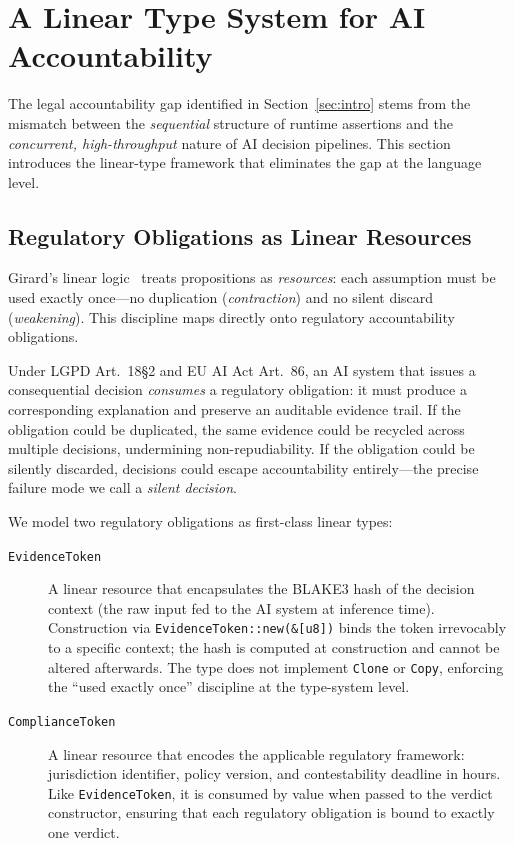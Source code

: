 
\section{A Linear Type System for AI Accountability}
\label{sec:type_system}

The legal accountability gap identified in Section~\ref{sec:intro}
stems from the mismatch between the \emph{sequential} structure of
runtime assertions and the \emph{concurrent, high-throughput} nature
of AI decision pipelines.  This section introduces the linear-type
framework that eliminates the gap at the language level.

\subsection{Regulatory Obligations as Linear Resources}
\label{sec:linear_resources}

Girard's linear logic~\cite{girard1987linear} treats propositions as
\emph{resources}: each assumption must be used exactly once---no
duplication (\emph{contraction}) and no silent discard
(\emph{weakening}).  This discipline maps directly onto regulatory
accountability obligations.

Under LGPD Art.~18\S2 and EU AI Act Art.~86, an AI system that
issues a consequential decision \emph{consumes} a regulatory
obligation: it must produce a corresponding explanation and preserve
an auditable evidence trail.  If the obligation could be duplicated,
the same evidence could be recycled across multiple decisions,
undermining non-repudiability.  If the obligation could be silently
discarded, decisions could escape accountability entirely---the
precise failure mode we call a \emph{silent decision}.

We model two regulatory obligations as first-class linear types:

\begin{description}
  \item[\texttt{EvidenceToken}]  A linear resource that encapsulates
    the BLAKE3 hash of the decision context (the raw input fed to the
    AI system at inference time).  Construction via
    \texttt{EvidenceToken::new(\&[u8])} binds the token irrevocably to
    a specific context; the hash is computed at construction and cannot
    be altered afterwards.  The type does not implement \texttt{Clone}
    or \texttt{Copy}, enforcing the ``used exactly once'' discipline at
    the type-system level.

  \item[\texttt{ComplianceToken}]  A linear resource that encodes the
    applicable regulatory framework: jurisdiction identifier, policy
    version, and contestability deadline in hours.  Like
    \texttt{EvidenceToken}, it is consumed by value when passed to the
    verdict constructor, ensuring that each regulatory obligation is
    bound to exactly one verdict.
\end{description}

